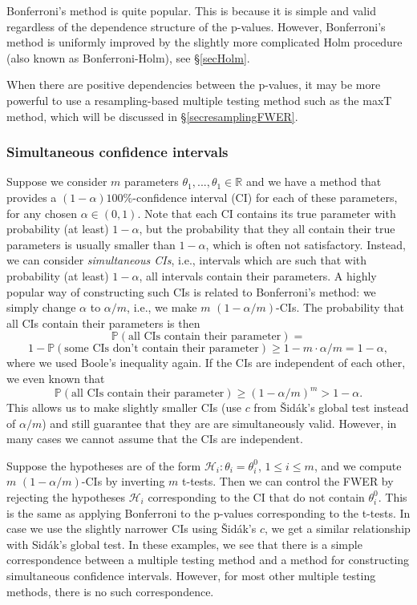 \documentclass[11pt]{article}
\theoremstyle{plain}
\theoremstyle{definition}
\newcommand{\Hy}{\mathcal{H}}
\newcommand{\pr}{\mathbb{P}}
\begin{document}
 Bonferroni's method is quite popular. This is because it is simple and valid regardless of the dependence structure of the p-values.  
 However, Bonferroni's method is uniformly improved by the slightly more complicated Holm  procedure (also known as Bonferroni-Holm), see \S\ref{secHolm}.
 
  When there are positive dependencies between the p-values, it may be more powerful to use a resampling-based multiple testing method such as the maxT method, which will be discussed in \S\ref{secresamplingFWER}.
 
 
 
\subsubsection{Simultaneous confidence intervals}
Suppose we consider $m$ parameters $\theta_1,...,\theta_1\in \mathbb{R}$ and we have a method that provides a $(1-\alpha)100\%$-confidence interval (CI) for each of these parameters, for any chosen $\alpha\in(0,1)$. Note that each CI contains its true parameter with probability (at least) $1-\alpha$, but the probability that they all contain their true parameters is usually smaller than $1-\alpha$, which is often not satisfactory. Instead, we can consider \emph{simultaneous CIs}, i.e., intervals which are such that with probability (at least) $1-\alpha$, all intervals contain their parameters. A highly popular way of constructing such CIs is related to Bonferroni's method: we simply change $\alpha$ to $\alpha/m$, i.e., we make $m$ $(1-\alpha/m)$-CIs. The probability that all CIs contain their parameters is then
$$\pr(\text{all CIs contain their parameter})=$$
$$1- \pr(\text{some CIs don't contain their parameter}) \geq 1- m\cdot \alpha/m=1-\alpha,$$ where we used Boole's inequality again.  If the CIs are independent of each other, we even known that 
$$\pr(\text{all CIs contain their parameter}) \geq (1-\alpha/m)^m>1-\alpha.$$ This allows us to make slightly smaller CIs (use $c$ from \v{S}id\'{a}k's global test instead of $\alpha/m$) and still guarantee that they are are simultaneously valid. However, in many cases we cannot assume that the CIs are independent.


Suppose the hypotheses are of the form $\Hy_i: \theta_i=\theta_i^0$, $1\leq i \leq m$, and we compute $m$ $(1-\alpha/m)$-CIs by inverting $m$ t-tests. Then we can control the FWER by rejecting the hypotheses $\Hy_i$ corresponding to the CI that do not contain $\theta_i^0$. This is the same as applying Bonferroni to the p-values corresponding to the t-tests. In case we use the slightly narrower CIs using \v{S}id\'{a}k's $c$, we get a similar relationship with {S}id\'{a}k's global test. In these examples, we see that there is a simple correspondence between a multiple testing method and a method for constructing simultaneous confidence intervals. However, for most other multiple testing methods, there is no such correspondence.
\end{document}
